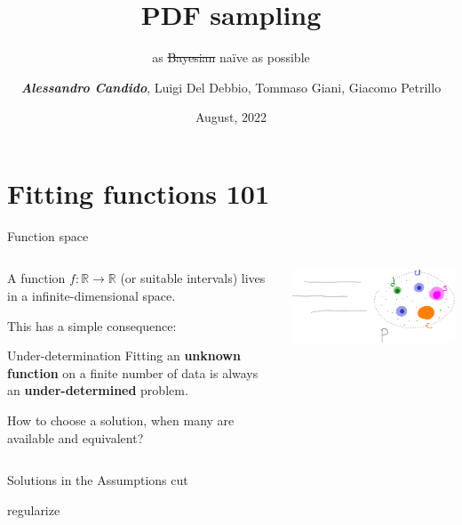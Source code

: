 \documentclass[9pt]{beamer}
\title{PDF sampling}
\subtitle{as \sout{Bayesian} na\"ive as possible}
\date{August, 2022}
\author{\textit{\textbf{Alessandro Candido}}, Luigi Del Debbio, Tommaso Giani, Giacomo Petrillo}
\begin{document}
\maketitle


\section{Fitting functions 101}

\begin{frame}{Function space}
    \begin{columns}
        \begin{column}{0.5\textwidth}
            A function $f: \mathbb{R} \to \mathbb{R}$ (or suitable intervals)
            lives in a infinite-dimensional space.
            \vspace*{20pt}

            This has a simple consequence:
            \begin{block}{Under-determination}
                Fitting an \textbf{unknown function} on a finite number of data
                is always an \textbf{under-determined} problem.
            \end{block}
            \vspace*{20pt}

            How to choose a solution, when \alert{many} are available and
            \alert{equivalent}?
        \end{column}
        \begin{column}{0.5\textwidth}
            \includegraphics[width=\textwidth]{intrinsic}
        \end{column}
    \end{columns}
\end{frame}

\begin{frame}{Solutions in the Assumptions}
    cut

    regularize
\end{frame}
\end{document}
